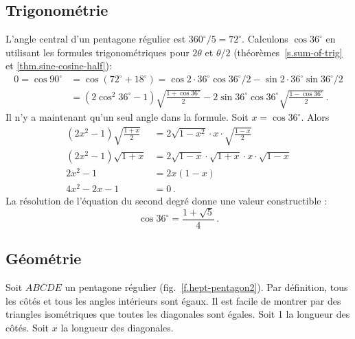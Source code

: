 \subsection{Trigonométrie}
L'angle central d'un pentagone régulier est  $360^\circ/5=72^\circ$. Calculons $\cos 36^\circ$ en utilisant les formules trigonométriques pour $2\theta$ et $\theta/2$  (théorèmes~\ref{s.sum-of-trig} et \ref{thm.sine-cosine-half}):
\begin{align*}
0=\cos 90^\circ &= \cos(72^\circ+18^\circ)=\cos 2\cdot 36^\circ\cos 36^\circ/2 - \sin 2\cdot 36^\circ\sin 36^\circ/2\\
&=(2\cos^2 36^\circ-1)\sqrt{\frac{1+\cos 36^\circ}{2}}-2\sin 36^\circ\cos 36^\circ\sqrt{\frac{1-\cos 36^\circ}{2}}\,.
\end{align*}
Il n'y a maintenant qu'un seul angle dans la formule. Soit $x=\cos 36^\circ$. Alors 
\begin{align*}
(2x^2-1)\sqrt{\frac{1+x}{2}}&=2\sqrt{1-x^2}\cdot x \cdot \sqrt{\frac{1-x}{2}}\\
(2x^2-1)\sqrt{1+x}&=2\sqrt{1-x}\cdot\sqrt{1+x}\cdot x \cdot \sqrt{1-x}\\
2x^2-1&=2x(1-x)\\
4x^2-2x-1&=0\,.
\end{align*}
La résolution de l'équation du second degré donne une valeur constructible :
\[
\cos 36^\circ = \frac{1+\sqrt{5}}{4}\,.
\]

\subsection{Géométrie}\label{s.geometry-pentagon}

Soit $\overline{ABCDE}$ un pentagone régulier (fig.~\ref{f.hept-pentagon2}). Par définition, tous les côtés et tous les angles intérieurs sont égaux. Il est facile de montrer par des triangles isométriques que toutes les diagonales sont égales. Soit 1 la longueur des côtés. Soit $x$ la longueur des diagonales.

